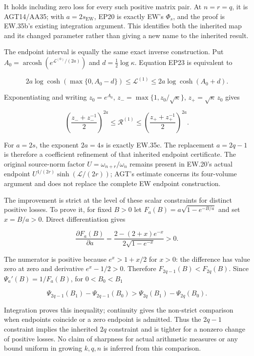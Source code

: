 It holds including zero loss for every such positive matrix pair. At \(n=r=q\), it is AGT14/AA35; with \(a=2s_{\mathrm{EW}}\), EP20 is exactly EW's \(\Phi_s\), and the proof is EW.35b's existing integration argument. This identifies both the inherited map and its changed parameter rather than giving a new name to the inherited result.

The endpoint interval is equally the same exact inverse construction. Put \(A_0=\operatorname{arcosh}(e^{\mathscr L^{(0)}/(2a)})\) and \(d=\tfrac12\log\kappa\). Equation EP23 is equivalent to

\[
2a\log\cosh(\max\{0,A_0-d\})
\le\mathscr L^{(1)}\le2a\log\cosh(A_0+d).
\tag{EP24}
\]

Exponentiating and writing \(z_0=e^{A_0}\), \(z_-=\max\{1,z_0/\sqrt\kappa\}\), \(z_+=\sqrt\kappa\,z_0\) gives

\[
\left(\frac{z_-+z_-^{-1}}2\right)^{2a}
\le\mathscr R^{(1)}\le
\left(\frac{z_++z_+^{-1}}2\right)^{2a}.
\tag{EP25}
\]

For \(a=2s\), the exponent \(2a=4s\) is exactly EW.35c. The replacement \(a=2q-1\) is therefore a coefficient refinement of that inherited endpoint certificate. The original source-norm factor \(U=\omega_{n+r}/\omega_n\) remains present in EW.20's actual endpoint \(U^{1/(2r)}\sinh(\mathscr L/(2r))\); AGT's estimate concerns its four-volume argument and does not replace the complete EW endpoint construction.

The improvement is strict at the level of these scalar constraints for distinct positive losses. To prove it, for fixed \(B>0\) let \(F_a(B)=a\sqrt{1-e^{-B/a}}\) and set \(x=B/a>0\). Direct differentiation gives

\[
\frac{\partial F_a(B)}{\partial a}
=\frac{2-(2+x)e^{-x}}{2\sqrt{1-e^{-x}}}>0.
\tag{EP26}
\]

The numerator is positive because \(e^x>1+x/2\) for \(x>0\): the difference has value zero at zero and derivative \(e^x-1/2>0\). Therefore \(F_{2q-1}(B)<F_{2q}(B)\). Since \(\Psi_a'(B)=1/F_a(B)\), for \(0<B_0<B_1\)

\[
\Psi_{2q-1}(B_1)-\Psi_{2q-1}(B_0)
>\Psi_{2q}(B_1)-\Psi_{2q}(B_0).
\tag{EP27}
\]

Integration proves this inequality; continuity gives the non-strict comparison when endpoints coincide or a zero endpoint is admitted. Thus the \(2q-1\) constraint implies the inherited \(2q\) constraint and is tighter for a nonzero change of positive losses. No claim of sharpness for actual arithmetic measures or any bound uniform in growing \(k,q,n\) is inferred from this comparison.

